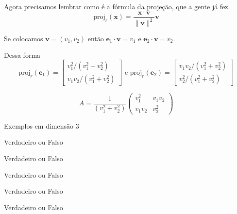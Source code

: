 \documentclass{beamer}
\begin{document}
\begin{frame}
  Agora precisamos lembrar como é a fórmula da projeção, que a gente já fez.
  $$ \text{proj}_{r}(\mathbf{x}) = \frac{\mathbf{x}\cdot\mathbf{v}}{\|\mathbf{v}\|^2}\mathbf{v}$$

  Se colocamos $\mathbf{v}=(v_1,v_2)$ então $\mathbf{e}_1 \cdot \mathbf{v} = v_1$ e  $\mathbf{e}_2 \cdot \mathbf{v} = v_2.$ 
 
  Dessa forma
    $$
    \text{proj}_{r}(\mathbf{e}_1) =
    \begin{bmatrix}
  v_1^2/(v_1^2 + v_2^2) \\ v_1v_2 / (v_1^2 + v_2^2)
\end{bmatrix} \text{ e }\text{proj}_{r}(\mathbf{e}_2) =
\begin{bmatrix}
v_1 v_2/(v_1^2 + v_2^2) \\ v_2^2 / (v_1^2 + v_2^2)
\end{bmatrix} 
$$

$$ A = \frac{1}{(v_1^2+v_2^2)}\begin{pmatrix}
  v_1^2 & v_1v_2 \\ v_1v_2 & v_2^2
\end{pmatrix}
$$
\end{frame}

\begin{frame}{Exemplos em dimensão 3}
  
\end{frame}

\begin{frame}{Verdadeiro ou Falso}
  \begin{block}{1}


\end{block}
\end{frame}

\begin{frame}{Verdadeiro ou Falso}
  \begin{block}{2}
  
\end{block}
\end{frame}

\begin{frame}{Verdadeiro ou Falso}
  \begin{block}{3}
  
\end{block}
\end{frame}   

\begin{frame}{Verdadeiro ou Falso}
  \begin{block}{4}
  
\end{block}
\end{frame}

\begin{frame}{Verdadeiro ou Falso}
  \begin{block}{5}

\end{block}
\end{frame}
\end{document}
